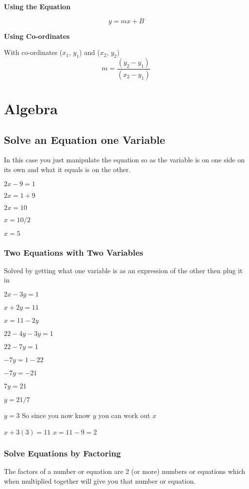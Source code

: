 \documentclass{article}
\begin{document}
\textbf{Using the Equation}

\begin{equation}
y = mx + B
\end{equation}

\textbf{Using Co-ordinates}

With co-ordinates ($x_1$, $y_1$) and ($x_2$, $y_2$) 
\begin{equation}
m = \frac{ (y_2 - y_1) }{ (x_2 - y_1) }
\end{equation}


\newpage
\section{Algebra}
\subsection{Solve an Equation one Variable}
In this case you just manipulate the equation so as the variable is on one side on its own and what it equals is on the other.

$2x - 9 = 1$

$2x = 1 + 9 $

$2x = 10 $

$x = 10 /2 $

$x = 5$

\subsubsection{Two Equations with Two Variables}
Solved by getting what one variable is as an expression of the other then plug it in

$2x -3y = 1 $  
       
$x + 2y = 11 $	     

$x = 11 -2y$

$22-4y -3y = 1$

$22 - 7y = 1$

$-7y = 1-22$

$-7y = -21$

$7y = 21$

$y =21/7$

$y = 3$
So since you now know $y$ you can work out $x$

$x + 3 (3) = 11$
$x = 11 -9 = 2$

\subsubsection{Solve Equations by Factoring}
The factors of a number or equation are 2 (or more) numbers or equations which when multiplied together will give you that number or equation.
\end{document}

